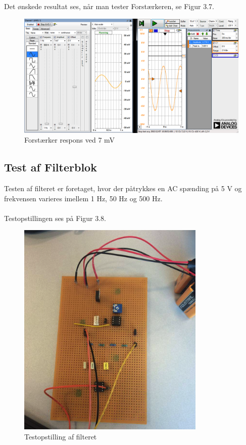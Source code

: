 Det ønskede resultat ses, når man tester Forstærkeren, se Figur 3.7. 

\begin{figure}[H]
	\centering
	\includegraphics[width=1\textwidth]{Figurer/Snip20151207_37}
	\caption{Forstærker respons ved 7 mV}
\end{figure}


\subsection{Test af Filterblok}
Testen af filteret er foretaget, hvor der påtrykkes en AC spænding på 5 V og frekvensen varieres imellem 1 Hz, 50 Hz og 500 Hz. \\ \\

Testopstillingen ses på Figur 3.8.  

\begin{figure}[H]
	\centering
	\includegraphics[width=0.8\textwidth]{Figurer/Snip20151207_38}
	\caption{Testopstilling af filteret}
	\label{fig:Filter}
\end{figure}

